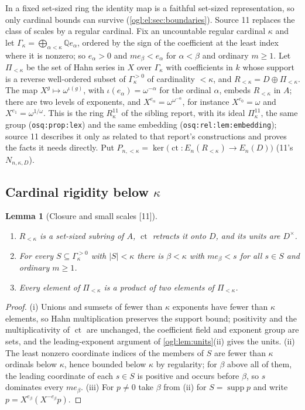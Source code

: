 \documentclass[11pt,oneside]{article}
\numberwithin{equation}{section}
\newtheorem{lemma}[lemma]{Lemma}
\theoremstyle{definition}
\theoremstyle{remark}
\newcommand{\Q}{\mathbb Q}
\newcommand{\ct}{\operatorname{ct}}
\newcommand{\supp}{\operatorname{supp}}
\newcommand{\src}[1]{\textup{\textsf{\small[#1]}}}
\newcommand{\replabel}[1]{\nolinkurl{#1}}
\begin{document}
In a fixed set-sized ring the identity map is a faithful set-sized
representation, so only cardinal bounds can survive
(\cref{ogl:el:sec:boundaries}). Source 11 replaces the class of scales by a
regular cardinal. Fix an uncountable regular cardinal $\kappa$ and let
$\Gamma_\kappa=\bigoplus_{\alpha<\kappa}\Q e_\alpha$, ordered by the sign of
the coefficient at the least index where it is nonzero; so $e_\alpha>0$ and
$me_\beta<e_\alpha$ for $\alpha<\beta$ and ordinary $m\ge1$. Let
$\Pi_{<\kappa}$ be the set of Hahn series in $X$ over $\Gamma_\kappa$ with
coefficients in $k$ whose support is a reverse well-ordered subset of
$\Gamma_\kappa^{>0}$ of cardinality $<\kappa$, and $R_{<\kappa}=D\oplus\Pi_{<\kappa}$.
The map $X^g\mapsto\omega^{\iota(g)}$, with $\iota(e_\alpha)=\omega^{-\alpha}$
for the ordinal $\alpha$, embeds $R_{<\kappa}$ in $A$; there are two levels of
exponents, and $X^{e_\alpha}=\omega^{\omega^{-\alpha}}$, for instance
$X^{e_0}=\omega$ and $X^{e_1}=\omega^{1/\omega}$. This is the ring $R^{11}_\kappa$
of the sibling report, with its ideal $\Pi^{11}_\kappa$, the same group
(\replabel{osq:prop:lex}) and the same embedding
(\replabel{osq:rel:lem:embedding}); source 11 describes it only as related to
that report's constructions and proves the facts it needs directly. Put
$P_{n,<\kappa}=\ker\bigl(\ct:E_n(R_{<\kappa})\to E_n(D)\bigr)$ (11's
$N_{n,\kappa,D}$).

\subsection{Cardinal rigidity below \texorpdfstring{$\kappa$}{kappa}}

\begin{lemma}[Closure and small scales \src{11}]\label{ogl:ker:lem:fragment}
\leavevmode
\begin{enumerate}
\item $R_{<\kappa}$ is a set-sized subring of $A$, $\ct$ retracts it onto $D$,
and its units are $D^\times$.
\item For every $S\subseteq\Gamma_\kappa^{>0}$ with $|S|<\kappa$ there is
$\beta<\kappa$ with $me_\beta<s$ for all $s\in S$ and ordinary $m\ge1$.
\item Every element of $\Pi_{<\kappa}$ is a product of two elements of
$\Pi_{<\kappa}$.
\end{enumerate}
\end{lemma}
\begin{proof}
(i) Unions and sumsets of fewer than $\kappa$ exponents have fewer than $\kappa$
elements, so Hahn multiplication preserves the support bound; positivity and the
multiplicativity of $\ct$ are unchanged, the coefficient field and exponent
group are sets, and the leading-exponent argument of \cref{ogl:lem:units}(ii)
gives the units. (ii) The least nonzero coordinate indices of the members of
$S$ are fewer than $\kappa$ ordinals below $\kappa$, hence bounded below $\kappa$
by regularity; for $\beta$ above all of them, the leading coordinate of each
$s\in S$ is positive and occurs before $\beta$, so $s$ dominates every
$me_\beta$. (iii) For $p\ne0$ take $\beta$ from (ii) for $S=\supp p$ and write
$p=X^{e_\beta}(X^{-e_\beta}p)$.
\end{proof}
\end{document}
